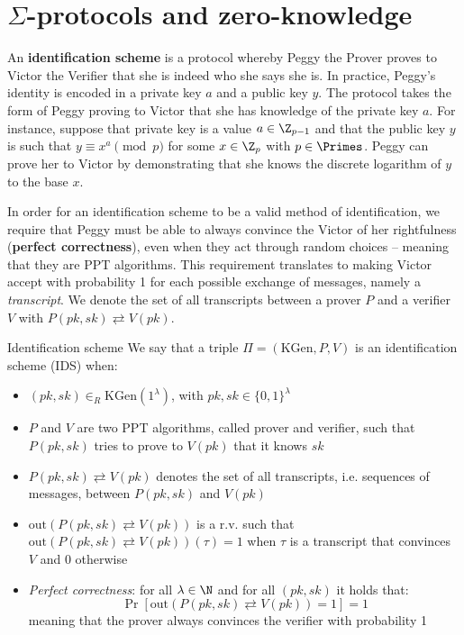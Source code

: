 \documentclass[a4paper, 12pt]{report}
\begin{document}
    \section{$\Sigma$-protocols and zero-knowledge}

    An \textbf{identification scheme} is a protocol whereby Peggy the Prover proves to Victor the Verifier that she is indeed who she says she is. In practice, Peggy's identity is encoded in a private key $a$ and a public key $y$. The protocol takes the form of Peggy proving to Victor that she has knowledge of the private key $a$. For instance, suppose that private key is a value $a \in \Z_{p-1}$ and that the public key $y$ is such that $y \equiv x^a \pmod p$ for some $x \in \Z_p$ with $p \in \Primes$. Peggy can prove her to Victor by demonstrating that she knows the discrete logarithm of $y$ to the base $x$.

    In order for an identification scheme to be a valid method of identification, we require that Peggy must be able to always convince the Victor of her rightfulness (\textbf{perfect correctness}), even when they act through random choices -- meaning that they are PPT algorithms. This requirement translates to making Victor accept with probability 1 for each possible exchange of messages, namely a \textit{transcript}. We denote the set of all transcripts between a prover  $P$ and a verifier $V$ with $P(pk, sk) \rightleftarrows V(pk)$.
    
    \begin{frameddefn}{Identification scheme}
        We say that a triple $\Pi = (\mathrm{KGen}, P, V)$ is an identification scheme (IDS) when:
        \begin{itemize}
            \item $(pk,sk) \in_R \mathrm{KGen}(1^\lambda)$, with $pk,sk \in \{0,1\}^\lambda$
            \item $P$ and $V$ are two PPT algorithms, called prover and verifier, such that $P(pk,sk)$ tries to prove to $V(pk)$ that it knows $sk$
            \item $P(pk, sk) \rightleftarrows V(pk)$ denotes the set of all transcripts, i.e. sequences of messages, between $P(pk, sk)$ and $V(pk)$
            \item $\mathrm{out}(P(pk, sk) \rightleftarrows V(pk))$ is a r.v. such that $\mathrm{out}(P(pk, sk) \rightleftarrows V(pk))(\tau) = 1$ when $\tau$ is a transcript that convinces $V$ and $0$ otherwise
            \item \textit{Perfect correctness}: for all $\lambda \in \N$ and for all $(pk,sk)$ it holds that:
            \[\Pr[\mathrm{out}(P(pk, sk) \rightleftarrows V(pk)) = 1] = 1\]
            meaning that the prover always convinces the verifier with probability 1
        \end{itemize}
    \end{frameddefn}
\end{document}
